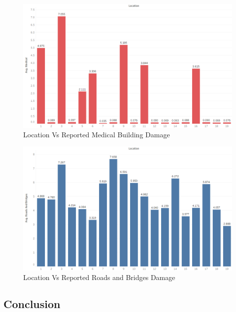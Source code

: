 \documentclass[12pt]{extarticle}
\begin{document}
\begin{figure}[H]
\centering
	\includegraphics[width=\linewidth]{Images/medical.png}
	\caption{Location Vs Reported Medical Building Damage }
	\label{fig:medical}
\end{figure}

\begin{figure}[H]
\centering
	\includegraphics[width=\linewidth]{Images/Road.png}
	\caption{Location Vs Reported Roads and Bridges Damage }
	\label{fig:road}
\end{figure}
 
 \newpage
\begin{centering}
	\section{Conclusion}
\end{centering}
\end{document}
